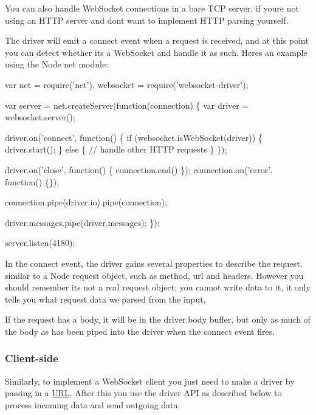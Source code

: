 You can also handle Web\+Socket connections in a bare T\+CP server, if you\textquotesingle{}re not using an H\+T\+TP server and don\textquotesingle{}t want to implement H\+T\+TP parsing yourself.

The driver will emit a {\ttfamily connect} event when a request is received, and at this point you can detect whether it\textquotesingle{}s a Web\+Socket and handle it as such. Here\textquotesingle{}s an example using the Node {\ttfamily net} module\+:


\begin{DoxyCode}
var net = require('net'),
    websocket = require('websocket-driver');

var server = net.createServer(function(connection) \{
  var driver = websocket.server();

  driver.on('connect', function() \{
    if (websocket.isWebSocket(driver)) \{
      driver.start();
    \} else \{
      // handle other HTTP requests
    \}
  \});

  driver.on('close', function() \{ connection.end() \});
  connection.on('error', function() \{\});

  connection.pipe(driver.io).pipe(connection);

  driver.messages.pipe(driver.messages);
\});

server.listen(4180);
\end{DoxyCode}


In the {\ttfamily connect} event, the driver gains several properties to describe the request, similar to a Node request object, such as {\ttfamily method}, {\ttfamily url} and {\ttfamily headers}. However you should remember it\textquotesingle{}s not a real request object; you cannot write data to it, it only tells you what request data we parsed from the input.

If the request has a body, it will be in the {\ttfamily driver.\+body} buffer, but only as much of the body as has been piped into the driver when the {\ttfamily connect} event fires.

\subsubsection*{Client-\/side}

Similarly, to implement a Web\+Socket client you just need to make a driver by passing in a \mbox{\hyperlink{namespace_u_r_l}{U\+RL}}. After this you use the driver A\+PI as described below to process incoming data and send outgoing data.


